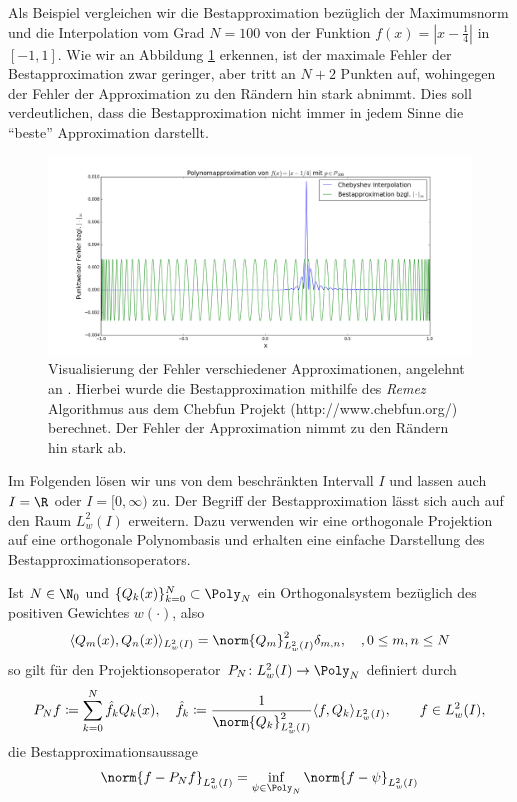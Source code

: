 \begin{mathbsp}
Als Beispiel vergleichen wir die Bestapproximation bezüglich der Maximumsnorm und die \chebyspace Interpolation vom Grad $N=100$ von der Funktion $f(x)=|x-\frac{1}{4}|$ in $[-1,1]$. Wie wir an Abbildung \ref{polyapproxcomp} erkennen, ist der maximale Fehler der Bestapproximation zwar geringer, aber tritt an $N+2$ Punkten auf, wohingegen der Fehler der \chebyspace Approximation zu den Rändern hin stark abnimmt. Dies soll verdeutlichen, dass die Bestapproximation nicht immer in jedem Sinne die "`beste"' Approximation darstellt.
\begin{figure}[ht]
 \center
 \includegraphics[width=\linewidth]{Figures/polynomial_approx_comparison.png}
 \caption{Visualisierung der Fehler verschiedener Approximationen, angelehnt an \autocite{Trefethen}. Hierbei wurde die Bestapproximation mithilfe des \emph{Remez} Algorithmus aus dem Chebfun Projekt (http://www.chebfun.org/) berechnet. Der Fehler der \chebyspace Approximation nimmt zu den Rändern hin stark ab.}
 \label{polyapproxcomp}
\end{figure}
\end{mathbsp}
Im Folgenden lösen wir uns von dem beschränkten Intervall $I$ und lassen auch $I=\R$ oder $I=[0,\infty)$ zu. Der Begriff der Bestapproximation lässt sich auch auf den Raum $L_w^2(I)$ erweitern. Dazu verwenden wir eine orthogonale Projektion auf eine orthogonale Polynombasis und erhalten eine einfache Darstellung des Bestapproximationsoperators.
\begin{maththeorem}
Ist $N\in\N_0$ und $\lbrace Q_k(x)\rbrace_{k=0}^N\subset \Poly_N$ ein Orthogonalsystem bezüglich des positiven Gewichtes $w(\cdot)$, also 
\[\langle Q_m(x),Q_n(x)\rangle_{L_w^2(I)}=\norm{Q_m}^2_{L_w^2(I)}\delta_{m,n},\quad, 0\le m,n\le N\]
so gilt für den Projektionsoperator $P_N\colon L_w^2(I)\to \Poly_N$ definiert durch 
\[P_Nf\coloneqq \sum_{k=0}^N\hat{f}_kQ_k(x),\quad \hat{f}_k\coloneqq \frac{1}{\norm{Q_k}_{L_w^2(I)}^2}\langle f,Q_k\rangle_{L_w^2(I)},\qquad f\in L^2_w(I),\]
die Bestapproximationsaussage
\[\norm{f-P_Nf}_{L_w^2(I)}=\inf\limits_{\psi\in\Poly_N}\norm{f-\psi}_{L_w^2(I)}\]
\end{maththeorem}
